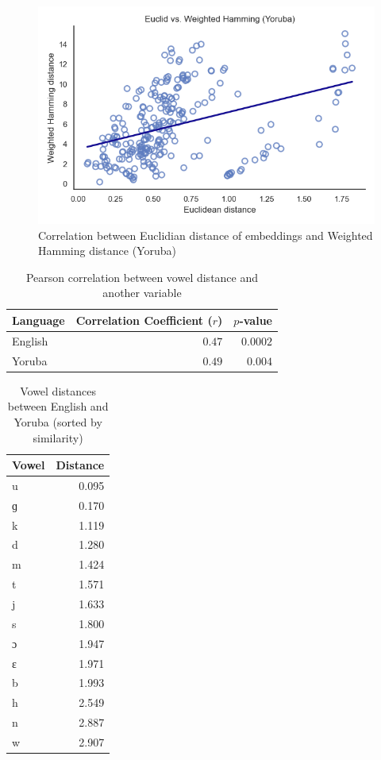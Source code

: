\documentclass[11pt]{article}
\begin{document}
{\begin{figure}
    \centering
    \includegraphics[width=1\linewidth]{yorlastcor.png}
    \caption{Correlation between Euclidian distance of embeddings and Weighted Hamming distance (Yoruba)}
    \label{fig:placeholder}
\end{figure}

\begin{table}[h]
\centering
\caption{Pearson correlation between vowel distance and another variable}
\begin{tabular}{lrr}
\toprule
\textbf{Language} & \textbf{Correlation Coefficient ($r$)} & \textbf{$p$-value} \\
\midrule
English & $0.47$ & $0.0002$ \\
Yoruba  & $0.49$ & $0.004$ \\
\bottomrule
\end{tabular}
\end{table}



\begin{table}
\caption{Vowel distances between English and Yoruba (sorted by similarity)}
\centering
\begin{tabular}{lr}
\toprule
Vowel & Distance \\
\midrule
u & 0.095 \\
ɡ & 0.170 \\
k & 1.119 \\
d & 1.280 \\
m & 1.424 \\
t & 1.571 \\
j & 1.633 \\
s & 1.800 \\
ɔ & 1.947 \\
ɛ & 1.971 \\
b & 1.993 \\
h & 2.549 \\
n & 2.887 \\
w & 2.907 \\
					

\end{tabular}
\end{table}}
\end{document}
